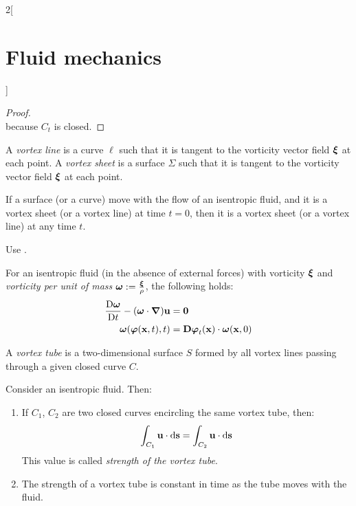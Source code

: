 \documentclass[../../../main_physics.tex]{subfiles}
\begin{document}
\begin{multicols}{2}[\section{Fluid mechanics}]
\begin{proof}
$$    $$
    because $C_t$ is closed.
  \end{proof}
  \begin{definition}
    A \emph{vortex line} is a curve $\ell$ such that it is tangent to the vorticity vector field $\boldsymbol{\mathrm{\xi}}$ at each point. A \emph{vortex sheet} is a surface $\Sigma$ such that it is tangent to the vorticity vector field $\boldsymbol{\mathrm{\xi}}$ at each point.
  \end{definition}
  \begin{proposition}
    If a surface (or a curve) move with the flow of an isentropic fluid, and it is a vortex sheet (or a vortex line) at time $t=0$, then it is a vortex sheet (or a vortex line) at any time $t$.
  \end{proposition}
  \begin{sproof}
    Use .
  \end{sproof}
  \begin{proposition}\label{FLM:isentropicVorticity}
    For an isentropic fluid (in the absence of external forces) with vorticity $\boldsymbol{\mathrm{\xi}}$ and \emph{vorticity per unit of mass} $\boldsymbol{\mathrm{\omega}}:=\frac{\boldsymbol{\mathrm{\xi}}}{\rho}$, the following holds:
    \begin{align*}
      \frac{\mathrm{D}\boldsymbol{\mathrm{\omega}}}{\mathrm{D}t}-(\boldsymbol{\mathrm{\omega}}\cdot\grad)\boldsymbol{\mathrm{u}} & =\boldsymbol{\mathrm{0}}                                              \\
      \boldsymbol{\mathrm{\omega}}(\boldsymbol{\mathrm{\varphi}}(\boldsymbol{\mathrm{x}},t), t)               & =\boldsymbol{\mathrm{D}}\boldsymbol{\mathrm{\varphi}}_t(\boldsymbol{\mathrm{x}})\cdot \boldsymbol{\mathrm{\omega}}(\boldsymbol{\mathrm{x}},0)
    \end{align*}
  \end{proposition}
  \begin{definition}
    A \emph{vortex tube} is a two-dimensional surface $S$ formed by all vortex lines passing through a given closed curve $C$.
  \end{definition}
  \begin{theorem}
    Consider an isentropic fluid. Then:
    \begin{enumerate}
      \item If $C_1$, $C_2$ are two closed curves encircling the same vortex tube, then:
            $$
              \int_{C_1}\boldsymbol{\mathrm{u}}\cdot \dd\boldsymbol{\mathrm{s}}=\int_{C_2}\boldsymbol{\mathrm{u}}\cdot \dd\boldsymbol{\mathrm{s}}
            $$
            This value is called \emph{strength of the vortex tube}.
      \item The strength of a vortex tube is constant in time as the tube moves with the fluid.
    \end{enumerate}
  \end{theorem}

\end{multicols}
\end{document}
